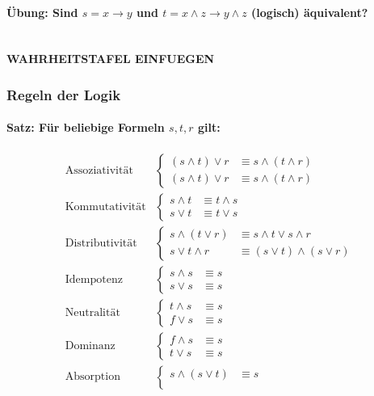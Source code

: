 \paragraph{Übung: Sind $s = x \rightarrow y$ und $t = x \land z \rightarrow y \land z$ (logisch) äquivalent?}
\ \\ \textbf{WAHRHEITSTAFEL EINFUEGEN}
%
\subsubsection{Regeln der Logik}
\paragraph{Satz: Für beliebige Formeln $s,t,r$ gilt:}
\begin{align*}
\text{Assoziativität}&\begin{cases}
(s \land t) \lor r &\equiv s \land (t \land r)\\
(s \land t) \lor r &\equiv s \land (t \land r)
\end{cases} \\
%
\text{Kommutativität}&\begin{cases}
s \land t &\equiv t \land s\\
s \lor t &\equiv t \lor s
\end{cases} \\
%
\text{Distributivität}&\begin{cases}
s \land (t \lor r) &\equiv s \land t \lor s \land r\\
s \lor t \land r &\equiv (s \lor t) \land (s \lor r)
\end{cases} \\
%
\text{Idempotenz}&\begin{cases}
s \land s &\equiv s \\
s \lor s &\equiv s
\end{cases} \\
%
\text{Neutralität}&\begin{cases}
t \land s &\equiv s \\
f \lor s &\equiv s
\end{cases} \\
%
\text{Dominanz}&\begin{cases}
f \land s &\equiv s \\
t \lor s &\equiv s
\end{cases} \\
%
\text{Absorption}&\begin{cases}
s \land (s \lor t) &\equiv s \\

\end{cases}
\end{align*}
